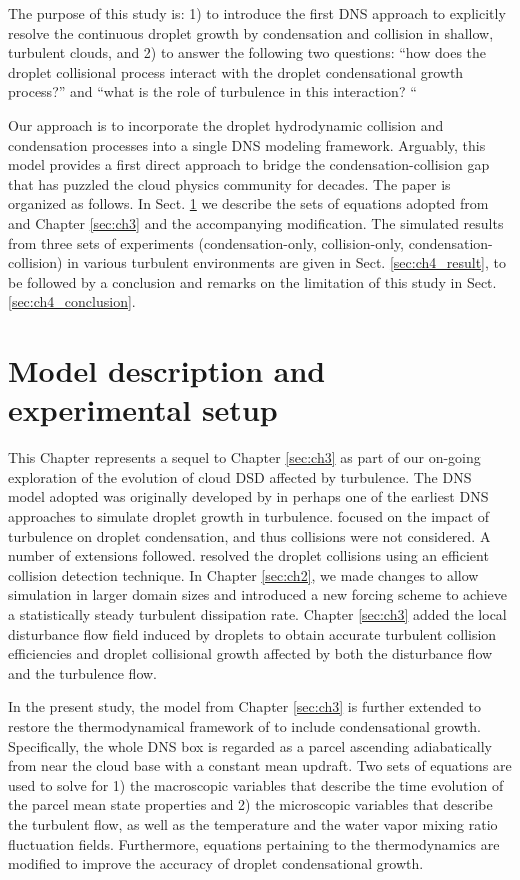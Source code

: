 The purpose of this study is: 1) to introduce the first DNS approach to explicitly resolve the continuous droplet growth by condensation and collision in shallow, turbulent clouds, and 2) to answer the following two questions: “how does the droplet collisional process interact with the droplet condensational growth process?” and “what is the role of turbulence in this interaction? “

Our approach is to incorporate the droplet hydrodynamic collision and condensation processes into a single DNS modeling framework. Arguably, this model provides a first direct approach to bridge the condensation-collision gap that has puzzled the cloud physics community for decades. The paper is organized as follows. In Sect. \ref{sec:ch4_method} we describe the sets of equations adopted from \citet{Vaillancourt2001} and Chapter \ref{sec:ch3} \citep{Chen2018} and the accompanying modification. The simulated results from three sets of experiments (condensation-only, collision-only, condensation-collision) in various turbulent environments are given in Sect. \ref{sec:ch4_result}, to be followed by a conclusion and remarks on the limitation of this study in Sect. \ref{sec:ch4_conclusion}.

\section{Model description and experimental setup}\label{sec:ch4_method}
This Chapter represents a sequel to Chapter \ref{sec:ch3} as part of our on-going exploration of the evolution of cloud DSD affected by turbulence. The DNS model adopted was originally developed by \citet{Vaillancourt2001} in perhaps one of the earliest DNS approaches to simulate droplet growth in turbulence. \citet{Vaillancourt2001} focused on the impact of turbulence on droplet condensation, and thus collisions were not considered. A number of extensions followed. \citet{Franklin2005} resolved the droplet collisions using an efficient collision detection technique. In Chapter \ref{sec:ch2}, we made changes to allow simulation in larger domain sizes and introduced a new forcing scheme to achieve a statistically steady turbulent dissipation rate. Chapter \ref{sec:ch3} added the local disturbance flow field induced by droplets to obtain accurate turbulent collision efficiencies and droplet collisional growth affected by both the disturbance flow and the turbulence flow. 

In the present study, the model from Chapter \ref{sec:ch3} is further extended to restore the thermodynamical framework of \citet{Vaillancourt2001} to include condensational growth. Specifically, the whole DNS box is regarded as a parcel ascending adiabatically from near the cloud base with a constant mean updraft. Two sets of equations are used to solve for 1) the macroscopic variables that describe the time evolution of the parcel mean state properties and 2) the microscopic variables that describe the turbulent flow, as well as the temperature and the water vapor mixing ratio fluctuation fields. Furthermore, equations pertaining to the thermodynamics are modified to improve the accuracy of droplet condensational growth.

